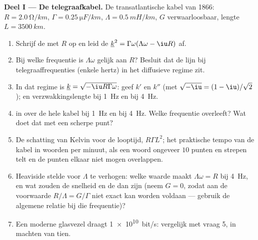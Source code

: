 \begin{problem}
\label{pb:b2:dispersion-wave-packets:1}

\medskip
\noindent\textbf{Deel I --- De telegraafkabel.}
De transatlantische kabel van 1866: $R = \qty{2.0}{\ohm/km}$,
$\Gamma = \qty{0.25}{\micro F/km}$, $\Lambda = \qty{0.5}{mH/km}$, $G$
verwaarloosbaar, lengte $L = \qty{3500}{km}$.
\begin{enumerate}
  \item Schrijf de  met $R$ op en leid de
        $\underline k^2 = \Gamma\omega(\Lambda\omega - \iu R)$ af.
  \item Bij welke frequentie is $\Lambda\omega$ gelijk aan $R$? Besluit dat
        de lijn bij telegraaffrequenties (enkele hertz) in het diffusieve
        regime zit.
  \item In dat regime is $\underline k = \sqrt{-\iu R\Gamma\omega}$: geef
        $k'$ en $k''$ (met $\sqrt{-\iu} = (1 - \iu)/\sqrt2$); 
        en verzwakkingslengte bij \qty{1}{Hz} en bij \qty{4}{Hz}.
  \item {} in  over de hele kabel bij \qty{1}{Hz} en bij
        \qty{4}{Hz}. Welke frequentie overleeft? Wat doet dat met een
        scherpe punt?
  \item De schatting van Kelvin voor de looptijd, $R\Gamma L^2$; het
        praktische tempo van de kabel in woorden per minuut, als een woord
        ongeveer $10$ punten en strepen telt en de punten elkaar niet mogen
        overlappen.
  \item Heaviside stelde voor $\Lambda$ te verhogen: welke waarde maakt
        $\Lambda\omega = R$ bij \qty{4}{Hz}, en wat zouden de snelheid en de
         dan zijn (neem $G = 0$, zodat aan de voorwaarde
        $R/\Lambda = G/\Gamma$ niet exact kan worden voldaan --- gebruik de
        algemene relatie bij die frequentie)?
  \item Een moderne glasvezel draagt \qty{1e10}{bit/s}: vergelijk met vraag
        5, in machten van tien.
\end{enumerate}


\end{problem}
